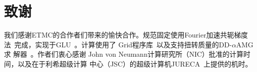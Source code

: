 \section*{致谢}
我们感谢ETMC的合作者们带来的愉快合作。规范固定使用Fourier加速共轭梯度
法~\cite{Hudspith:2014oja}完成，实现于GLU~\cite{GLU}。计算使用了
Grid程序库~\cite{Boyle:2016lbp}以及支持扭转质量的DD-$\alpha$AMG求
解器~\cite{Frommer:2013fsa,Alexandrou:2016izb}。作者们衷心感谢
John von Neumann计算研究所（NIC）批准的计算时间，以及在于利希超级计算
中心（JSC）的超级计算机JURECA~\cite{jureca}上提供的机时。

